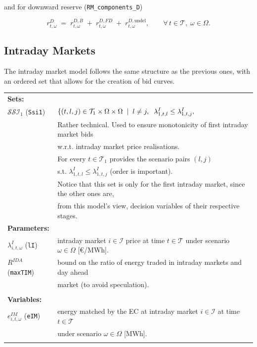 \documentclass{article}
\begin{document}
and for downward reserve (\verb|RM_components_D|)

\begin{equation} \label{EQ:RDcomp}
    r^{D}_{t,\omega} \;=\;
        r^{D,B}_{t,\omega}
      \;+\; r^{D,FD}_{t,\omega}
      \;+\; r^{D,\text{undel}}_{t,\omega},
    \qquad \forall\, t\in\mathcal T,\;\omega\in\Omega .
\end{equation}


\subsection{Intraday Markets}

The intraday market model follows the same structure as the previous ones, with an ordered set that allows for the creation of bid curves.

\begin{tabularx}{\textwidth}{l l}
    \textbf{Sets:} \\
    	$\mathcal{SSI}_1$ (\verb|Ssi1|) & $\{(t, l, j) \in \mathcal{T}_1 \times \Omega \times \Omega \hspace{2mm} | \hspace{2mm} l \neq j, \hspace{2mm} \lambda^I_{1, t, l} \leq \lambda^I_{1, t, j}, \hspace{2mm}$ \\ 
	& Rather technical. Used to ensure monotonicity of first intraday market bids \\
	& w.r.t. intraday market price realisations. \\
	& For every $t \in \mathcal{T}_1$ provides the scenario pairs $(l, j)$  \\
	&  s.t. $\lambda^I_{1, t, l} \leq \lambda^I_{1, t, j}$ (order is important). \\
    & Notice that this set is only for the first intraday market, since the other ones are,\\
    & from this model's view, decision variables of their respective stages.
    \\
    
    \textbf{Parameters:} \\
    	$\lambda^I_{i, t, \omega}$ (\verb|lI|) & intraday market $i \in \mathcal{I}$ price at time $t \in \mathcal{T}$ under scenario $\omega \in \Omega$ [\euro/MWh]. \\

	$R^{IDA}$ (\verb|maxTIM|) & bound on the ratio of energy traded in intraday markets and day ahead \\
	& market (to avoid speculation).\\
    \\ 
       
    \textbf{Variables:} \\
    $e^{IM}_{i, t, \omega}$ (\verb|eIM|) & energy matched by the EC at intraday market $i \in \mathcal{I}$ at time $t \in \mathcal{T}$ \\
    & under scenario $\omega \in \Omega$ [MWh]. \\
	\\
\end{tabularx}
\end{document}
